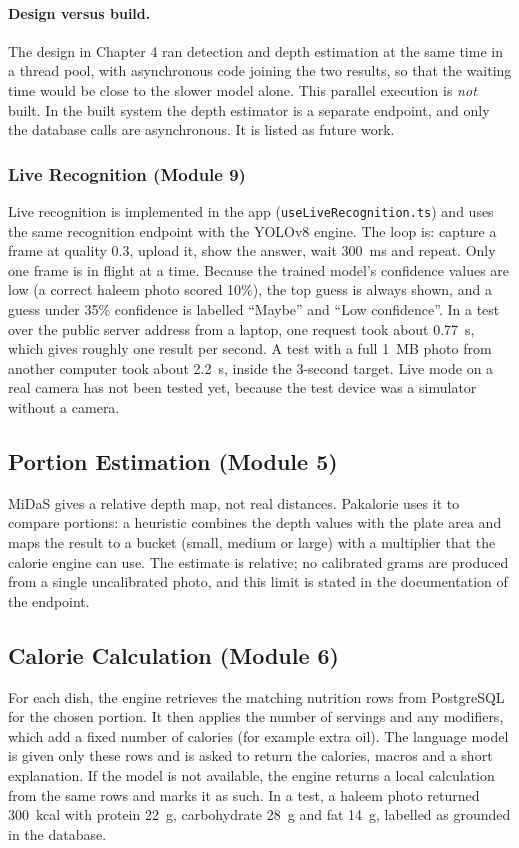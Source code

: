 \paragraph{Design versus build.} The design in Chapter 4 ran detection and depth estimation at the same time in
a thread pool, with asynchronous code joining the two results, so that the waiting time would be close to the
slower model alone. This parallel execution is \emph{not} built. In the built system the depth estimator is a
separate endpoint, and only the database calls are asynchronous. It is listed as future work.

\subsubsection{Live Recognition (Module 9)}
Live recognition is implemented in the app (\texttt{useLiveRecognition.ts}) and uses the same recognition
endpoint with the YOLOv8 engine. The loop is: capture a frame at quality 0.3, upload it, show the answer, wait
300~ms and repeat. Only one frame is in flight at a time. Because the trained model's confidence values are low
(a correct haleem photo scored 10\%), the top guess is always shown, and a guess under 35\% confidence is
labelled ``Maybe'' and ``Low confidence''. In a test over the public server address from a laptop, one request
took about 0.77~s, which gives roughly one result per second. A test with a full 1~MB photo from another
computer took about 2.2~s, inside the 3-second target. Live mode on a real camera has not been tested yet,
because the test device was a simulator without a camera.

\subsection{Portion Estimation (Module 5)}
MiDaS gives a relative depth map, not real distances. Pakalorie uses it to compare portions: a heuristic
combines the depth values with the plate area and maps the result to a bucket (small, medium or large) with a
multiplier that the calorie engine can use. The estimate is relative; no calibrated grams are produced from a
single uncalibrated photo, and this limit is stated in the documentation of the endpoint.

\subsection{Calorie Calculation (Module 6)}
For each dish, the engine retrieves the matching nutrition rows from PostgreSQL for the chosen portion. It then
applies the number of servings and any modifiers, which add a fixed number of calories (for example extra oil).
The language model is given only these rows and is asked to return the calories, macros and a short
explanation. If the model is not available, the engine returns a local calculation from the same rows and marks
it as such. In a test, a haleem photo returned 300~kcal with protein 22~g, carbohydrate 28~g and fat 14~g,
labelled as grounded in the database.

